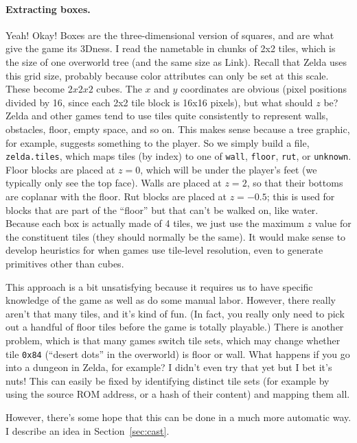 \documentclass[twocolumn]{article}
\begin{document}
\paragraph{Extracting boxes.} 
Yeah! Okay! Boxes are the three-dimensional version of squares, and
are what give the game its 3Dness. I read the nametable in chunks of
2x2 tiles, which is the size of one overworld tree (and the same size
as Link). Recall that Zelda uses this grid size, probably because
color attributes can only be set at this scale. These become $2x2x2$
cubes. The $x$ and $y$ coordinates are obvious (pixel positions
divided by 16, since each 2x2 tile block is 16x16 pixels), but what
should $z$ be? Zelda and other games tend to use tiles quite
consistently to represent walls, obstacles, floor, empty space, and so
on. This makes sense because a tree graphic, for example, suggests
something to the player. So we simply build a file,
\verb+zelda.tiles+, which maps tiles (by index) to one of \verb+wall+,
\verb+floor+, \verb+rut+, or \verb+unknown+. Floor blocks are placed
at $z=0$, which will be under the player's feet (we typically only see
the top face). Walls are placed at $z=2$, so that their bottoms are
coplanar with the floor. Rut blocks are placed at $z=-0.5$; this is
used for blocks that are part of the ``floor'' but that can't be
walked on, like water. Because each box is actually made of 4 tiles,
we just use the maximum $z$ value for the constituent tiles (they should
normally be the same). It would make sense to develop heuristics for
when games use tile-level resolution, even to generate primitives
other than cubes.

This approach is a bit unsatisfying because it requires us to have
specific knowledge of the game as well as do some manual labor.
However, there really aren't that many tiles, and it's kind of fun.
(In fact, you really only need to pick out a handful of floor tiles
before the game is totally playable.) There is another problem, which
is that many games switch tile sets, which may change whether tile
\verb+0x84+ (``desert dots'' in the overworld) is floor or wall. What
happens if you go into a dungeon in Zelda, for example? I didn't even
try that yet but I bet it's nuts! This can easily be fixed by
identifying distinct tile sets (for example by using the source ROM
address, or a hash of their content) and mapping them all.

However, there's some hope that this can be done in a much more
automatic way. I describe an idea in Section~\ref{sec:cast}.
\end{document}
